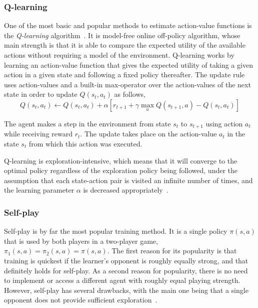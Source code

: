 \documentclass{article}
\begin{document}
\subsubsection{Q-learning}

One of the most basic and popular methods to estimate action-value functions is the
\emph{Q-learning} algorithm~\citep{Watkins1989PhD}. It is model-free online off-policy algorithm,
whose main strength is that it is able to compare the expected utility of the available actions
without requiring a model of the environment. Q-learning works by learning an action-value function
that gives the expected utility of taking a given action in a given state and following a fixed
policy thereafter. The update rule uses action-values and a built-in max-operator over the
action-values of the next state in order to update $Q(s_t, a_t)$ as follows,
%
\begin{equation}
    Q(s_t, a_t) \gets Q(s_t, a_t) + \alpha [r_{t+1} + \gamma \max_a Q(s_{t+1}, a) - Q(s_t, a_t)]
\end{equation}

The agent makes a step in the environment from state $s_t$ to $s_{t+1}$ using action $a_t$ while
receiving reward $r_t$. The update takes place on the action-value $a_t$ in the state $s_t$ from
which this action was executed.

Q-learning is exploration-intensive, which means that it will converge to the optimal policy
regardless of the exploration policy being followed, under the assumption that each state-action
pair is visited an infinite number of times, and the learning parameter $\alpha$ is decreased
appropriately~\citep{Watkins1992Q}.

\subsubsection{Self-play}

Self-play is by far the most popular training method. It is a single policy $\pi(s,a)$ that is used
by both players in a two-player game, $\pi_1(s,a) = \pi_2(s,a) = \pi(s,a)$. The first reason for its
popularity is that training is quickest if the learner's opponent is roughly equally strong, and
that definitely holds for self-play. As a second reason for popularity, there is no need to
implement or access a different agent with roughly equal playing strength. However, self-play has
several drawbacks, with the main one being that a single opponent does not provide sufficient
exploration~\citep{Szita2011RLGames}.
\end{document}
